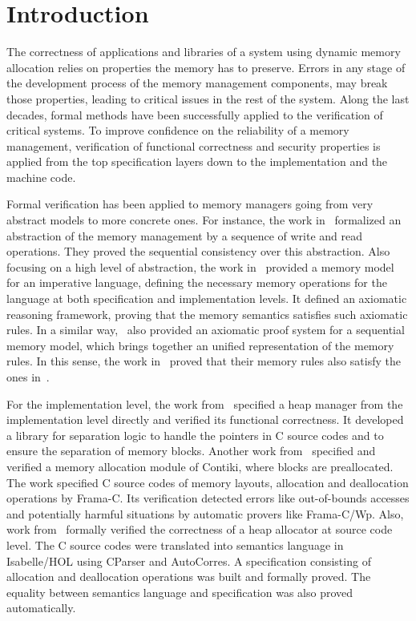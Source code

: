 \section{Introduction}
The correctness of applications and libraries of a system using dynamic memory allocation relies on properties the memory has to preserve. Errors in any stage of the development process of the memory management components, may break those properties, leading to critical issues in the rest of the system. Along the last decades, formal methods have been successfully applied to the verification of critical systems. To improve confidence on the reliability of a memory management, verification of functional correctness and security properties is applied from the top specification layers down to the implementation and the machine code.

Formal verification has been applied to memory managers going from very abstract models to more concrete ones. For instance, the work in~\cite{reg_higham} formalized an abstraction of the memory management by a sequence of write and read operations. They proved the sequential consistency over this abstraction. Also focusing on a high level of abstraction, the work in~\cite{reg_blazy} provided a memory model for an imperative language, defining the necessary memory operations for the language at both specification and implementation levels. It defined an axiomatic reasoning framework, proving that the memory semantics satisfies such axiomatic rules. In a similar way,~\cite{reg_mansky} also provided an axiomatic proof system for a sequential memory model, which brings together an unified representation of the memory rules. In this sense, the work in~\cite{reg_mansky} proved that their memory rules also satisfy the ones in~\cite{reg_blazy}.

For the implementation level, the work from~\cite{reg_marti} specified a heap manager from the implementation level directly and verified its functional correctness. It developed a library for separation logic to handle the pointers in C source codes and to ensure the separation of memory blocks. Another work from~\cite{reg_mangano} specified and verified a memory allocation module of Contiki, where blocks are preallocated. The work specified C source codes of memory layouts, allocation and deallocation operations by Frama-C. Its verification detected errors like out-of-bounds accesses and potentially harmful situations by automatic provers like Frama-C/Wp. Also, work from~\cite{reg_sahebolamri} formally verified the correctness of a heap allocator at source code level. The C source codes were translated into semantics language in Isabelle/HOL using CParser and AutoCorres. A specification consisting of allocation and deallocation operations was built and formally proved. The equality between semantics language and specification was also proved automatically.

